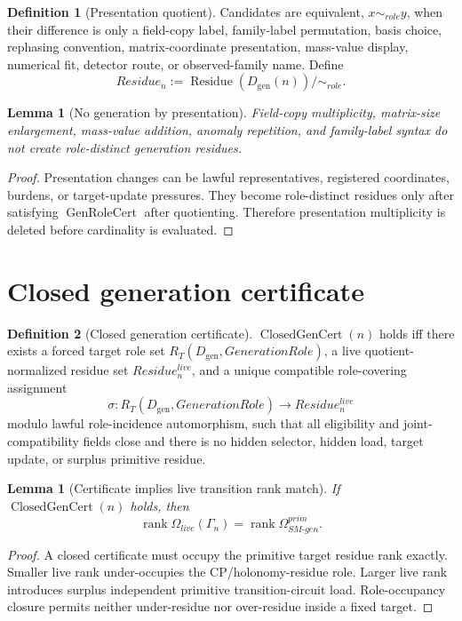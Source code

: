 \documentclass[11pt]{article}
\newcommand{\Dgen}{D_{\mathrm{gen}}}
\newcommand{\ClosedGenCert}{\operatorname{ClosedGenCert}}
\newcommand{\GenRoleCert}{\operatorname{GenRoleCert}}
\newcommand{\Residue}{\operatorname{Residue}}
\newcommand{\rank}{\operatorname{rank}}
\theoremstyle{definition}
\newtheorem{definition}{Definition}[section]
\theoremstyle{plain}
\newtheorem{lemma}[theorem]{Lemma}
\theoremstyle{remark}
\begin{document}
\begin{definition}[Presentation quotient]
Candidates are equivalent, \(x\sim_{role} y\), when their difference is only a field-copy label, family-label permutation, basis choice, rephasing convention, matrix-coordinate presentation, mass-value display, numerical fit, detector route, or observed-family name. Define
\[
Residue_n:=\Residue(\Dgen(n))/\sim_{role}.
\]
\end{definition}

\begin{lemma}[No generation by presentation]
Field-copy multiplicity, matrix-size enlargement, mass-value addition, anomaly repetition, and family-label syntax do not create role-distinct generation residues.
\end{lemma}
\begin{proof}
Presentation changes can be lawful representatives, registered coordinates, burdens, or target-update pressures. They become role-distinct residues only after satisfying \(\GenRoleCert\) after quotienting. Therefore presentation multiplicity is deleted before cardinality is evaluated.
\end{proof}

\section{Closed generation certificate}

\begin{definition}[Closed generation certificate]
\(\ClosedGenCert(n)\) holds iff there exists a forced target role set \(R_T(\Dgen,GenerationRole)\), a live quotient-normalized residue set \(Residue^{live}_n\), and a unique compatible role-covering assignment
\[
\sigma:R_T(\Dgen,GenerationRole)\to Residue^{live}_n
\]
modulo lawful role-incidence automorphism, such that all eligibility and joint-compatibility fields close and there is no hidden selector, hidden load, target update, or surplus primitive residue.
\end{definition}

\begin{lemma}[Certificate implies live transition rank match]
If \(\ClosedGenCert(n)\) holds, then
\[
\rank\Omega_{live}(\Gamma_n)=\rank\Omega_{SM\text{-}gen}^{prim}.
\]
\end{lemma}
\begin{proof}
A closed certificate must occupy the primitive target residue rank exactly. Smaller live rank under-occupies the CP/holonomy-residue role. Larger live rank introduces surplus independent primitive transition-circuit load. Role-occupancy closure permits neither under-residue nor over-residue inside a fixed target.
\end{proof}
\end{document}
